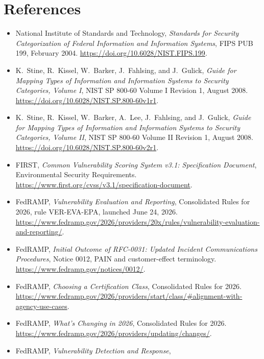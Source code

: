 \documentclass[11pt]{article}
\begin{document}
\clearpage
\section*{References}

{\small
\begin{itemize}[leftmargin=3.2em,itemsep=0.18em,topsep=0.3em]
\item[{[FIPS199]}] National Institute of Standards and Technology,
  \emph{Standards for Security Categorization of Federal Information and
  Information Systems}, FIPS PUB 199, February 2004.
  \url{https://doi.org/10.6028/NIST.FIPS.199}.
\item[{[SP800-60-1]}] K.~Stine, R.~Kissel, W.~Barker, J.~Fahlsing, and J.~Gulick,
  \emph{Guide for Mapping Types of Information and Information Systems to Security
  Categories, Volume I}, NIST SP 800-60 Volume I Revision 1, August 2008.
  \url{https://doi.org/10.6028/NIST.SP.800-60v1r1}.
\item[{[SP800-60-2]}] K.~Stine, R.~Kissel, W.~Barker, A.~Lee, J.~Fahlsing, and
  J.~Gulick, \emph{Guide for Mapping Types of Information and Information Systems
  to Security Categories, Volume II}, NIST SP 800-60 Volume II Revision 1,
  August 2008.
  \url{https://doi.org/10.6028/NIST.SP.800-60v2r1}.
\item[{[CVSS31]}] FIRST, \emph{Common Vulnerability Scoring System v3.1:
  Specification Document}, Environmental Security Requirements.
  \url{https://www.first.org/cvss/v3.1/specification-document}.
\item[{[FEDRAMP-VER]}] FedRAMP, \emph{Vulnerability Evaluation and Reporting},
  Consolidated Rules for 2026, rule VER-EVA-EPA, launched June 24, 2026.
  \url{https://www.fedramp.gov/2026/providers/20x/rules/vulnerability-evaluation-and-reporting/}.
\item[{[FEDRAMP-PAIN]}] FedRAMP, \emph{Initial Outcome of RFC-0031: Updated
  Incident Communications Procedures}, Notice 0012, PAIN and customer-effect
  terminology.
  \url{https://www.fedramp.gov/notices/0012/}.
\item[{[FEDRAMP-CLASS]}] FedRAMP, \emph{Choosing a Certification Class},
  Consolidated Rules for 2026.
  \url{https://www.fedramp.gov/2026/providers/start/class/#alignment-with-agency-use-cases}.
\item[{[FEDRAMP-2026]}] FedRAMP, \emph{What's Changing in 2026},
  Consolidated Rules for 2026.
  \url{https://www.fedramp.gov/2026/providers/updating/changes/}.
\item[{[FEDRAMP-VDR]}] FedRAMP, \emph{Vulnerability Detection and Response},

\end{itemize}}
\end{document}
